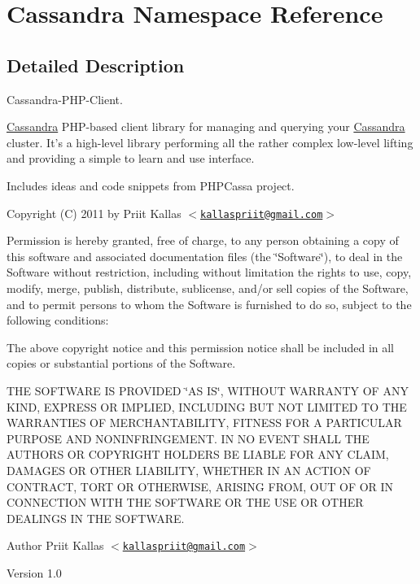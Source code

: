 \hypertarget{namespaceCassandra}{
\section{Cassandra Namespace Reference}
\label{namespaceCassandra}
}


\subsection{Detailed Description}
Cassandra-\/PHP-\/Client.

\hyperlink{classCassandra}{Cassandra} PHP-\/based client library for managing and querying your \hyperlink{classCassandra}{Cassandra} cluster. It's a high-\/level library performing all the rather complex low-\/level lifting and providing a simple to learn and use interface.

Includes ideas and code snippets from PHPCassa project.

Copyright (C) 2011 by Priit Kallas $<$\href{mailto:kallaspriit@gmail.com}{\tt kallaspriit@gmail.com}$>$

Permission is hereby granted, free of charge, to any person obtaining a copy of this software and associated documentation files (the \char`\"{}Software\char`\"{}), to deal in the Software without restriction, including without limitation the rights to use, copy, modify, merge, publish, distribute, sublicense, and/or sell copies of the Software, and to permit persons to whom the Software is furnished to do so, subject to the following conditions:

The above copyright notice and this permission notice shall be included in all copies or substantial portions of the Software.

THE SOFTWARE IS PROVIDED \char`\"{}AS IS\char`\"{}, WITHOUT WARRANTY OF ANY KIND, EXPRESS OR IMPLIED, INCLUDING BUT NOT LIMITED TO THE WARRANTIES OF MERCHANTABILITY, FITNESS FOR A PARTICULAR PURPOSE AND NONINFRINGEMENT. IN NO EVENT SHALL THE AUTHORS OR COPYRIGHT HOLDERS BE LIABLE FOR ANY CLAIM, DAMAGES OR OTHER LIABILITY, WHETHER IN AN ACTION OF CONTRACT, TORT OR OTHERWISE, ARISING FROM, OUT OF OR IN CONNECTION WITH THE SOFTWARE OR THE USE OR OTHER DEALINGS IN THE SOFTWARE.

\begin{DoxyAuthor}{Author}
Priit Kallas $<$\href{mailto:kallaspriit@gmail.com}{\tt kallaspriit@gmail.com}$>$
\end{DoxyAuthor}
\begin{DoxyVersion}{Version}
1.0 
\end{DoxyVersion}
